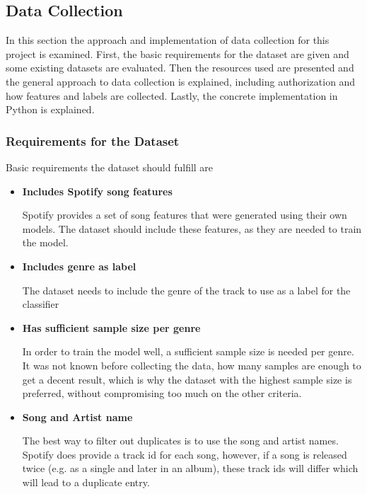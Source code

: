 \subsection{Data Collection}
\label{sec:Data Collection}

In this section the approach and implementation of data collection for this project is 
examined. First, the basic requirements for the dataset are given and some existing datasets
are evaluated. Then the resources used are presented and the general approach to data collection
is explained, including authorization and how features and labels are collected.
Lastly, the concrete implementation in Python is explained.

\subsubsection{Requirements for the Dataset}

Basic requirements the dataset should fulfill are

\begin{itemize}
    \item \textbf{Includes Spotify song features}

    Spotify provides a set of song features that were generated using their own models.
    The dataset should include these features, as they are needed to train the model.
    
    \item \textbf{Includes genre as label}

    The dataset needs to include the genre of the track to use as a label for the classifier

    \item \textbf{Has sufficient sample size per genre}

    In order to train the model well, a sufficient sample size is needed per genre.
    It was not known before collecting the data, how many samples are enough to get a decent result,
    which is why the dataset with the highest sample size is preferred, without compromising too
    much on the other criteria. 

    \item \textbf{Song and Artist name}

    The best way to filter out duplicates is to use the song and artist names.
    Spotify does provide a track id for each song, however, if a song is released twice
    (e.g. as a single and later in an album), these track ids will differ which will lead
    to a duplicate entry.
\end{itemize}

